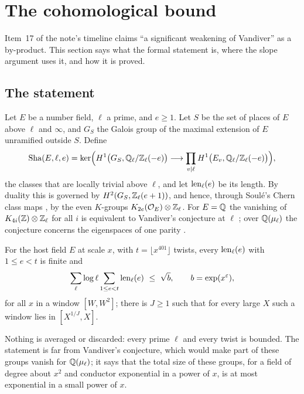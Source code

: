 \section{The cohomological bound}\label{sec:cohomology}

Item~17 of the note's timeline claims ``a significant weakening of Vandiver'' as a by-product.
This section says what the formal statement is, where the slope argument uses it, and how it is
proved.

\subsection{The statement}
Let $E$ be a number field, $\ell$ a prime, and $e\ge1$. Let $S$ be the set of places of $E$
above $\ell$ and $\infty$, and $G_S$ the Galois group of the maximal extension of $E$ unramified
outside $S$. Define \lvS
\[
\mathrm{Sha}(E,\ell,e)=\ker\Bigl(H^1\bigl(G_S,\mathbb{Q}_\ell/\mathbb{Z}_\ell(-e)\bigr)\longrightarrow
\prod_{v\mid\ell}H^1\bigl(E_v,\mathbb{Q}_\ell/\mathbb{Z}_\ell(-e)\bigr)\Bigr),
\]
the classes that are locally trivial above $\ell$, and let $\operatorname{len}_\ell(e)$ be its length. By
duality this is governed by $H^2(G_S,\mathbb{Z}_\ell(e+1))$, and hence, through Soul\'e's Chern class
maps \cite{soule1979}, by the even $K$-groups $K_{2e}(\mathcal{O}_E)\otimes\mathbb{Z}_\ell$. For $E=\mathbb{Q}$ the
vanishing of $K_{4i}(\mathbb{Z})\otimes\mathbb{Z}_\ell$ for all $i$ is equivalent to Vandiver's conjecture at
$\ell$ \cite{kurihara1992}; over $\mathbb{Q}(\mu_\ell)$ the conjecture concerns the eigenspaces of one
parity \cite{washington1997}.

\begin{statement}\label{st:vwin}
For the host field $E$ at scale $x$, with $t=\lfloor x^{401}\rfloor$ twists, every
$\operatorname{len}_\ell(e)$ with $1\le e<t$ is finite and
\[
\sum_{\ell}\log\ell\sum_{1\le e<t}\operatorname{len}_\ell(e)\ \le\ \sqrt{b},\qquad b=\exp(x^{\varepsilon}),
\]
for all $x$ in a window $[W,W^2]$; there is $J\ge1$ such that for every large $X$ such a window
lies in $[X^{1/J},X]$.
\end{statement}
Nothing is averaged or discarded: every prime $\ell$ and every twist is bounded. The statement
is far from Vandiver's conjecture, which would make part of these groups vanish for
$\mathbb{Q}(\mu_\ell)$; it says that the total size of these groups, for a field of degree about $x^2$
and conductor exponential in a power of $x$, is at most exponential in a small power of $x$.

